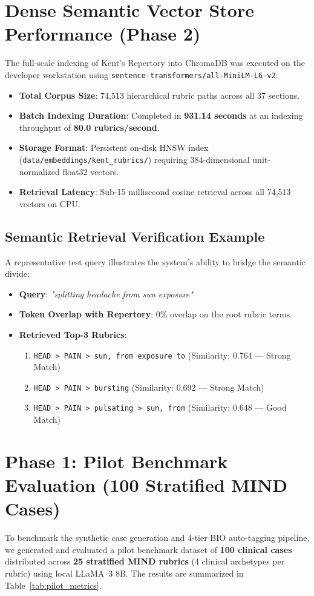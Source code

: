 \begin{sloppypar}
\section{Dense Semantic Vector Store Performance (Phase 2)}
The full-scale indexing of Kent's Repertory into ChromaDB was executed on the developer workstation using \texttt{sentence-transformers/all-MiniLM-L6-v2}:
\begin{itemize}
    \item \textbf{Total Corpus Size}: 74,513 hierarchical rubric paths across all 37 sections.
    \item \textbf{Batch Indexing Duration}: Completed in \textbf{931.14 seconds} at an indexing throughput of \textbf{80.0 rubrics/second}.
    \item \textbf{Storage Format}: Persistent on-disk HNSW index (\texttt{data/embeddings/kent\_rubrics/}) requiring 384-dimensional unit-normalized float32 vectors.
    \item \textbf{Retrieval Latency}: Sub-15 millisecond cosine retrieval across all 74,513 vectors on CPU.
\end{itemize}

\subsection{Semantic Retrieval Verification Example}
A representative test query illustrates the system's ability to bridge the semantic divide:
\begin{itemize}
    \item \textbf{Query}: \emph{"splitting headache from sun exposure"}
    \item \textbf{Token Overlap with Repertory}: 0\% overlap on the root rubric terms.
    \item \textbf{Retrieved Top-3 Rubrics}:
    \begin{enumerate}
        \item \texttt{HEAD > PAIN > sun, from exposure to} (Similarity: 0.764 --- Strong Match)
        \item \texttt{HEAD > PAIN > bursting} (Similarity: 0.692 --- Strong Match)
        \item \texttt{HEAD > PAIN > pulsating > sun, from} (Similarity: 0.648 --- Good Match)
    \end{enumerate}
\end{itemize}

\section{Phase 1: Pilot Benchmark Evaluation (100 Stratified MIND Cases)}
To benchmark the synthetic case generation and 4-tier BIO auto-tagging pipeline, we generated and evaluated a pilot benchmark dataset of \textbf{100 clinical cases} distributed across \textbf{25 stratified MIND rubrics} (4 clinical archetypes per rubric) using local LLaMA~3 8B. The results are summarized in Table~\ref{tab:pilot_metrics}.


\end{sloppypar}
